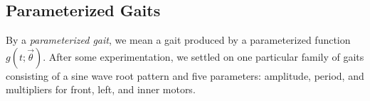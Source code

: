 \subsection{Parameterized Gaits}


By a \emph{parameterized gait}, we mean a gait produced by a
parameterized function $g(t; \vec{\theta})$.
After some experimentation, we settled on one particular family of
gaits consisting of a sine wave root pattern and five parameters:
amplitude, period, and multipliers for front, left, and inner
motors.




